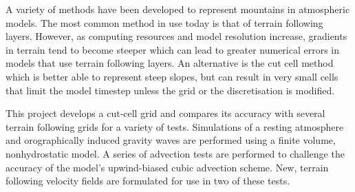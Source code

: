 A variety of methods have been developed to represent mountains in atmospheric models.  The most common method in use today is that of terrain following layers.  However, as computing resources and model resolution increase, gradients in terrain tend to become steeper which can lead to greater numerical errors in models that use terrain following layers.  An alternative is the cut cell method which is better able to represent steep slopes, but can result in very small cells that limit the model timestep unless the grid or the discretisation is modified.

This project develops a cut-cell grid and compares its accuracy with several terrain following grids for a variety of tests.  Simulations of a resting atmosphere and orographically induced gravity waves are performed using a finite volume, nonhydrostatic model.  A series of advection tests are performed to challenge the accuracy of the model's upwind-biased cubic advection scheme.  New, terrain following velocity fields are formulated for use in two of these tests.

